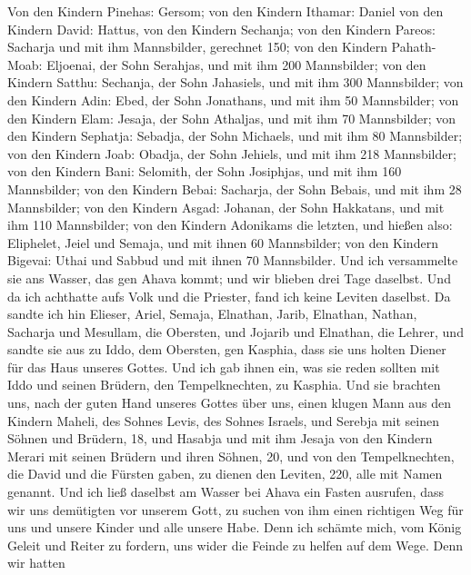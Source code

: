  Von den Kindern Pinehas: Gersom; von den Kindern Ithamar:
Daniel von den Kindern David: Hattus,  von den Kindern
Sechanja; von den Kindern Pareos: Sacharja und mit ihm Mannsbilder,
gerechnet 150;  von den Kindern Pahath-Moab: Eljoenai, der
Sohn Serahjas, und mit ihm 200 Mannsbilder;  von den Kindern
Satthu: Sechanja, der Sohn Jahasiels, und mit ihm 300 Mannsbilder;
 von den Kindern Adin: Ebed, der Sohn Jonathans, und mit ihm
50 Mannsbilder;  von den Kindern Elam: Jesaja, der Sohn
Athaljas, und mit ihm 70 Mannsbilder;  von den Kindern
Sephatja: Sebadja, der Sohn Michaels, und mit ihm 80 Mannsbilder;
 von den Kindern Joab: Obadja, der Sohn Jehiels, und mit ihm
218 Mannsbilder;  von den Kindern Bani: Selomith, der Sohn
Josiphjas, und mit ihm 160 Mannsbilder;  von den Kindern
Bebai: Sacharja, der Sohn Bebais, und mit ihm 28 Mannsbilder;
 von den Kindern Asgad: Johanan, der Sohn Hakkatans, und
mit ihm 110 Mannsbilder;  von den Kindern Adonikams die
letzten, und hießen also: Eliphelet, Jeiel und Semaja, und mit ihnen 60
Mannsbilder;  von den Kindern Bigevai: Uthai und Sabbud und
mit ihnen 70 Mannsbilder.  Und ich versammelte sie ans
Wasser, das gen Ahava kommt; und wir blieben drei Tage daselbst. Und da
ich achthatte aufs Volk und die Priester, fand ich keine Leviten
daselbst.  Da sandte ich hin Elieser, Ariel, Semaja,
Elnathan, Jarib, Elnathan, Nathan, Sacharja und Mesullam, die Obersten,
und Jojarib und Elnathan, die Lehrer,  und sandte sie aus
zu Iddo, dem Obersten, gen Kasphia, dass sie uns holten Diener für das
Haus unseres Gottes. Und ich gab ihnen ein, was sie reden sollten mit
Iddo und seinen Brüdern, den Tempelknechten, zu Kasphia. 
Und sie brachten uns, nach der guten Hand unseres Gottes über uns, einen
klugen Mann aus den Kindern Maheli, des Sohnes Levis, des Sohnes
Israels, und Serebja mit seinen Söhnen und Brüdern, 18, 
und Hasabja und mit ihm Jesaja von den Kindern Merari mit seinen Brüdern
und ihren Söhnen, 20,  und von den Tempelknechten, die
David und die Fürsten gaben, zu dienen den Leviten, 220, alle mit Namen
genannt.  Und ich ließ daselbst am Wasser bei Ahava ein
Fasten ausrufen, dass wir uns demütigten vor unserem Gott, zu suchen von
ihm einen richtigen Weg für uns und unsere Kinder und alle unsere Habe.
 Denn ich schämte mich, vom König Geleit und Reiter zu
fordern, uns wider die Feinde zu helfen auf dem Wege. Denn wir hatten
